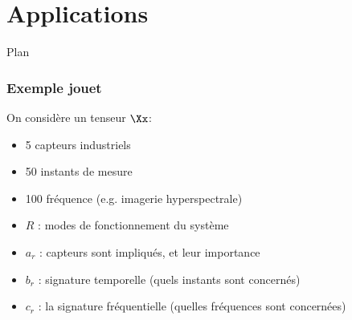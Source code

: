 \documentclass[9pt,table]{beamer} %
\begin{document}
\section{Applications}

\begin{frame}{Plan}
\tableofcontents[currentsection]
\end{frame}


\begin{frame}
\frametitle{Exemple jouet}

On considère un tenseur $\Xx$:
\begin{itemize}
	\item[-] 5 capteurs industriels
	\item[-] 50 instants de mesure
	\item[-] 100 fréquence (e.g. imagerie hyperspectrale)
\end{itemize}


\begin{tcolorbox}
\begin{itemize}
	\item[-] $R$ : modes de fonctionnement du système	
	\item[-] $a_r$ : capteurs sont impliqués, et leur importance
	\item[-] $b_r$ : signature temporelle (quels instants sont concernés) 
	\item[-] $c_r$ : la signature fréquentielle (quelles fréquences sont concernées)
\end{itemize}
\end{tcolorbox}

\end{frame}
\end{document}
